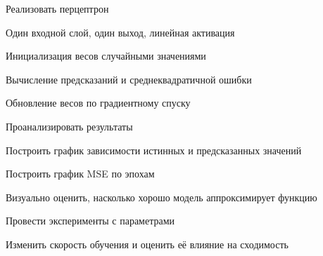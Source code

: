 \documentclass{article}%
\begin{document}
\begin{flushleft}%
Реализовать перцептрон%
%
\end{flushleft}%
\begin{flushleft}%
Один входной слой, один выход, линейная активация%
%
\end{flushleft}%
\begin{flushleft}%
Инициализация весов случайными значениями %
%
\end{flushleft}%
\begin{flushleft}%
Вычисление предсказаний и среднеквадратичной ошибки %
%
\end{flushleft}%
\begin{flushleft}%
Обновление весов по градиентному спуску %
%
\end{flushleft}%
\begin{flushleft}%
Проанализировать результаты %
%
\end{flushleft}%
\begin{flushleft}%
Построить график зависимости истинных и предсказанных значений %
%
\end{flushleft}%
\begin{flushleft}%
Построить график MSE по эпохам %
%
\end{flushleft}%
\begin{flushleft}%
Визуально оценить, насколько хорошо модель аппроксимирует функцию %
%
\end{flushleft}%
\begin{flushleft}%
Провести эксперименты с параметрами%
%
\end{flushleft}%
\begin{flushleft}%
Изменить скорость обучения и оценить её влияние на сходимость %
%
\end{flushleft}%
\end{document}
